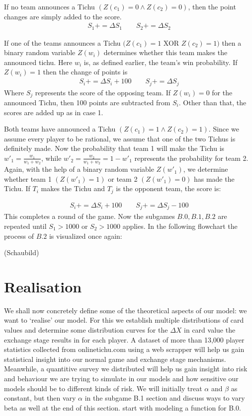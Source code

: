 \begin{axioms}[(C1)]
\item   If no team announces a Tichu $(Z(c_1) = 0 \land Z(c_2) = 0)$, then the point changes are simply added to the score.
\begin{gather*}
S_1 += \Delta S_1 \qquad S_2 += \Delta S_2
\end{gather*}
\item If one of the teams announces a Tichu $(Z(c_1) = 1$ XOR $Z(c_2) = 1)$ then a binary random variable $Z(w_i)$ determines whether this team makes the announced tichu. Here $w_i$ is, as defined earlier, the team's win probability. If $Z(w_i) = 1$ then the change of points is
\begin{gather*}
S_i += \Delta S_i + 100 \qquad S_j += \Delta S_j
\end{gather*}
Where $S_j$ represents the score of the opposing team. If $Z(w_i) = 0$ for the announced Tichu, then 100 points are subtracted from $S_i$. Other than that, the scores are added up as in case 1.
\item Both teams have announced a Tichu $(Z(c_1) = 1 \land Z(c_2) = 1)$. Since we assume every player to be rational, we assume that one of the two Tichus is definitely made. Now the probability that team 1 will make the Tichu is $w'_1 = \frac{w_1}{w_1+w_2}$, while $w'_2 =\frac{w_2}{w_1+w_2} = 1- w'_1$ represents the probability for team 2. Again, with the help of a binary random variable $Z(w'_1)$, we determine whether team 1 $(Z(w'_1) = 1)$ or team 2 $(Z(w'_1) = 0)$ has made the Tichu. If $T_i$ makes the Tichu and $T_j$ is the opponent team, the score is:

\begin{gather*}
S_i += \Delta S_i + 100 \qquad S_j += \Delta S_j - 100
\end{gather*}
This completes a round of the game. Now the subgames $B.0,B.1,B.2$ are repeated until $S_1 > 1000$ or $S_2 > 1000$ applies. In the following flowchart the process of $B.2$ is visualized once again:
\end{axioms}
(Schaubild)
\section{Realisation}
We shall now concretely define some of the theoretical aspects of our model: we want to ‘realise’ our model. For this we establish multiple distributions of card values and determine some distribution curves for the $\Delta  X$ in card value the exchange stage results in for each player. A dataset of more than 13,000 player statistics collected from onlinetichu.com using a web scrapper will help us gain statistical insight into our normal game and exchange stage mechanisms. Meanwhile, a quantitive survey we distributed will help us gain insight into risk and behaviour we are trying to simulate in our models and how sensitive our models should be to different kinds of risk. We will initially treat $\alpha$ and $\beta$ as constant, but then vary $\alpha$ in the subgame B.1 section and discuss ways to vary beta as well at the end of this section. start with modeling a function for B.0.


